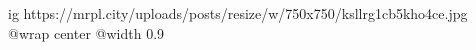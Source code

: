  
 
 
 
 

\ifcmt
  ig https://mrpl.city/uploads/posts/resize/w/750x750/ksllrg1cb5kho4ce.jpg
  @wrap center
  @width 0.9
\fi
